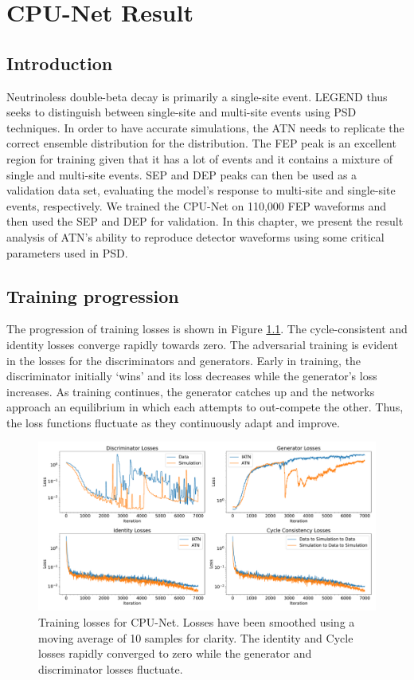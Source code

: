 \chapter{CPU-Net Result}\label{chap:cpu-net_result}

\section{Introduction}

Neutrinoless double-beta decay is primarily a single-site event. LEGEND thus seeks to distinguish between single-site and multi-site events using PSD techniques. In order to have accurate simulations, the ATN needs to replicate the correct ensemble distribution for the distribution. The FEP peak is an excellent region for training given that it has a lot of events and it contains a mixture of single and multi-site events. SEP and DEP peaks can then be used as a validation data set, evaluating the model's response to multi-site and single-site events, respectively. We trained the CPU-Net on 110,000 FEP waveforms and then used the SEP and DEP for validation. In this chapter, we present the result analysis of ATN's ability to reproduce detector waveforms using some critical parameters used in PSD. 


\section{Training progression}
The progression of training losses is shown in Figure \ref{fig:training_loss}. The cycle-consistent and identity losses converge rapidly towards zero. The adversarial training is evident in the losses for the discriminators and generators. Early in training, the discriminator initially `wins' and its loss decreases while the generator’s loss increases. As training continues, the generator catches up and the networks approach an equilibrium in which each attempts to out-compete the other. Thus, the loss functions fluctuate as they continuously adapt and improve.


\begin{figure}%
    \includegraphics[width=0.99\linewidth]{ch8/figs/loss_funcs.pdf}
    \caption{Training losses for CPU-Net. Losses have been smoothed using a moving average of 10 samples for clarity. The identity and Cycle losses rapidly converged to zero while the generator and discriminator losses fluctuate.} 
   \label{fig:training_loss}
\end{figure}

